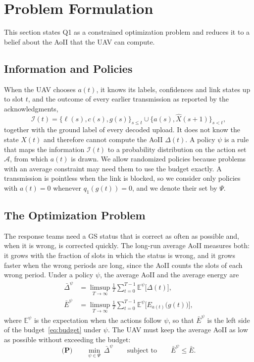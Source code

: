 \documentclass[journal]{IEEEtran}
\theoremstyle{remark}
\newcommand{\E}{\mathbb{E}}
\newcommand{\A}{\mathcal{A}}
\newcommand{\I}{\mathcal{I}}
\newcommand{\lab}{\ell}
\begin{document}
\section{Problem Formulation}\label{sec:problem}
This section states Q1 as a constrained optimization problem and reduces it to a belief about the AoII that the UAV can compute.

\subsection{Information and Policies}
When the UAV chooses $a(t)$, it knows its labels, confidences and link states up to slot $t$, and the outcome of every earlier transmission as reported by the acknowledgments,
\begin{equation}\label{eq:info}
\I(t)=\big\{\lab(s),c(s),g(s)\big\}_{s\le t}\cup\big\{a(s),\hat X(s+1)\big\}_{s<t},
\end{equation}
together with the ground label of every decoded upload.
It does not know the state $X(t)$ and therefore cannot compute the AoII $\Delta(t)$. A policy $\psi$ is a rule that maps the information $\I(t)$ to a probability distribution on the action set $\A$, from which $a(t)$ is drawn. We allow randomized policies because problems with an average constraint may need them to use the budget exactly. A transmission is pointless when the link is blocked, so we consider only policies with $a(t)=0$ whenever $q_1(g(t))=0$, and we denote their set by $\Psi$.

\subsection{The Optimization Problem}
The response teams need a GS status that is correct as often as possible and, when it is wrong, is corrected quickly. The long-run average AoII measures both: it grows with the fraction of slots in which the status is wrong, and it grows faster when the wrong periods are long, since the AoII counts the slots of each wrong period. Under a policy $\psi$, the average AoII and the average energy are
\begin{align}
\bar\Delta^{\psi}&=\limsup_{T\to\infty}\frac1T\sum_{t=0}^{T-1}\E^{\psi}\big[\Delta(t)\big],\label{eq:avgaoii}\\
\bar E^{\psi}&=\limsup_{T\to\infty}\frac1T\sum_{t=0}^{T-1}\E^{\psi}\Big[E_{a(t)}\big(g(t)\big)\Big],\label{eq:avgE}
\end{align}
where $\E^{\psi}$ is the expectation when the actions follow $\psi$, so that $\bar E^{\psi}$ is the left side of the budget~\eqref{eq:budget} under $\psi$. The UAV must keep the average AoII as low as possible without exceeding the budget:
\begin{equation}\label{eq:P}
\textbf{(P)}\qquad \min_{\psi\in\Psi}\ \bar\Delta^{\psi}\qquad\text{subject to}\qquad \bar E^{\psi}\le\bar E.
\end{equation}
\end{document}
